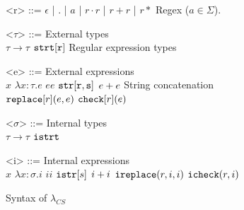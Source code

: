 \documentclass[10pt,preprint]{sigplanconf}
\theoremstyle{definition}
\newcommand{\lcs}{\lambda_{CS}}
\begin{document}
\begin{figure}
\begin{grammar}
<r> ::= $\epsilon$ | $.$ | $a$ | $r \cdot r$ | $r + r$ | $r*$ \hfill Regex ($a \in \Sigma$).

<$\tau$> ::=				\hfill	External types					\\
$\tau \rightarrow \tau$ \alt
${\tt strt[r]}$				\hfill Regular expression types

<e> ::= \hfill External expressions \\
      $x$ \alt
      $\lambda x:\tau.e$ \alt
      $e e$ \alt
      ${\tt str[r, s]}$ \alt
      $e + e$ \hfill String concatenation \\
      ${\tt replace}[r](e,e)$ \alt
      ${\tt check}[r](e)$

<$\sigma$> ::= \hfill Internal types \\
$\tau \rightarrow \tau$ \alt ${\tt istrt}$

<i> ::= \hfill Internal expressions \\
  $x$ \alt
  $\lambda x:\sigma.i$ \alt
  $i i$ \alt
  ${{\tt istr}[s]}$ \alt
  $i + i$ \alt
  ${\tt ireplace}(r,i,i)$ \alt
  ${\tt icheck}(r, i)$
\end{grammar}
\caption{Syntax of $\lcs$}
\label{fig:lcsSyntax}
\end{figure}
\end{document}
